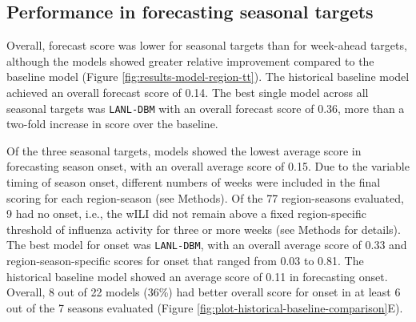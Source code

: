\documentclass{article}\usepackage[]{graphicx}\usepackage[]{color}
\begin{document}

\subsection*{Performance in forecasting seasonal targets}




Overall, forecast score was lower for seasonal targets than for week-ahead targets, although the models showed greater relative improvement compared to the baseline model (Figure \ref{fig:results-model-region-tt}).
The historical baseline model achieved  an overall forecast score of 
0.14.
The best single model across all seasonal targets was {\tt LANL-DBM} with an overall forecast score of 
0.36, more than a two-fold increase in score over the baseline.



Of the three seasonal targets, models showed the lowest average score in forecasting season onset, with an overall average score of 
0.15. 
Due to the variable timing of season onset, different numbers of weeks were included in the final scoring for each region-season (see Methods). 
Of the 77 region-seasons evaluated, 9 had no onset, i.e., the wILI did not remain above a fixed region-specific threshold of influenza activity for three or more weeks (see Methods for details). 
The best model for onset was 
{\tt LANL-DBM}, 
with an overall average score of 
0.33
and region-season-specific scores for onset that ranged from
0.03 to 
0.81.
The historical baseline model showed an average score of 
0.11 in forecasting onset.
Overall, 8 out of 22 models (36\%) had better overall score for onset in at least 6 out of the 7 seasons evaluated (Figure \ref{fig:plot-historical-baseline-comparison}E).
\end{document}
